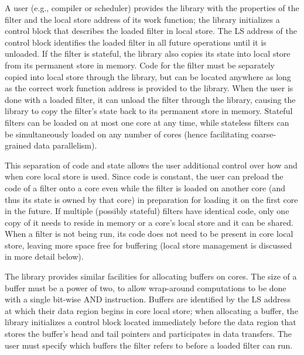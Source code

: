 A user (e.g., compiler or scheduler) provides the library with the
properties of the filter and the local store address of its work
function; the library initializes a control block that describes the
loaded filter in local store. The LS address of the control block
identifies the loaded filter in all future operations until it is
unloaded. If the filter is stateful, the library also copies its state
into local store from its permanent store in memory. Code for the
filter must be separately copied into local store through the library,
but can be located anywhere as long as the correct work function
address is provided to the library. When the user is done with a
loaded filter, it can unload the filter through the library, causing
the library to copy the filter's state back to its permanent store in
memory. Stateful filters can be loaded on at most one core at any
time, while stateless filters can be simultaneously loaded on any
number of cores (hence facilitating coarse-grained data parallelism).

This separation of code and state allows the user additional control
over how and when core local store is used. Since code is constant,
the user can preload the code of a filter onto a core even while the
filter is loaded on another core (and thus its state is owned by that
core) in preparation for loading it on the first core in the
future. If multiple (possibly stateful) filters have identical code,
only one copy of it needs to reside in memory or a core's local store
and it can be shared. When a filter is not being run, its code does
not need to be present in core local store, leaving more space free
for buffering (local store management is discussed in more detail
below).

The library provides similar facilities for allocating buffers on
cores. The size of a buffer must be a power of two, to allow
wrap-around computations to be done with a single bit-wise
\textsf{AND} instruction. Buffers are identified by the LS address
at which their data region begins in core local store; when allocating
a buffer, the library initializes a control block located immediately
before the data region that stores the buffer's head and tail pointers
and participates in data transfers. The user must specify which
buffers the filter refers to before a loaded filter can run.

